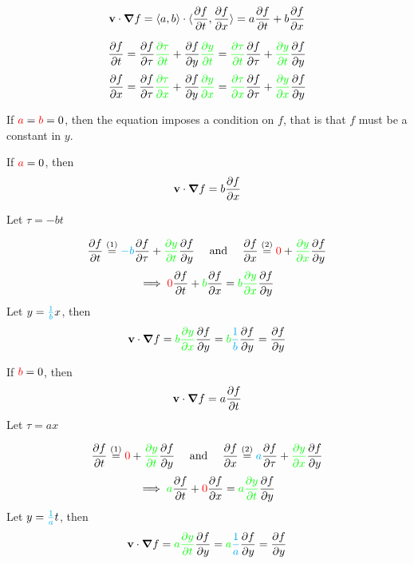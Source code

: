 \documentclass{article}
\begin{document}

\[\vb{v}\cdot \grad{f} = \langle a,b \rangle\cdot \langle
  \pdv{f}{t},\pdv{f}{x} \rangle =a\pdv{f}{t}+b\pdv{f}{x}\]

\begin{equation} \pdv{f}{t} = {\pdv{f}{\tau}} {\color{green} \pdv{\tau}{t}} +{\pdv{f}{y}} {\color{green}\pdv{y}{t}} =
  {\color{green}\pdv{\tau}{t}}\pdv{f}{\tau}
  +{\color{green}\pdv{y}{t}}\pdv{f}{y}
\end{equation}
\begin{equation}
  \pdv{f}{x} = {\pdv{f}{\tau}}{\color{green}\pdv{\tau}{x}}
  +{\pdv{f}{y}}{\color{green} \pdv{y}{x}} =
  {\color{green}\pdv{\tau}{x}}\pdv{f}{\tau}
  +{\color{green}\pdv{y}{x}}\pdv{f}{y}
  \end{equation}

If ${\color{red} a} = {\color{red}b} = 0$, then the equation imposes a
condition on $f$, that is that $f$ must be a constant in $y$.

If ${\color{red}a} = 0$, then
\[\vb{v}\cdot \grad{f} = b\pdv{f}{x}\]

Let $\tau = -bt$

\[\pdv{f}{t}
  \overset{(1)}{=} {\color{cyan} -b}\pdv{f}{\tau}
  +{\color{green}\pdv{y}{t}}\pdv{f}{y}\quad\text{ and }\quad\pdv{f}{x} \overset{(2)}{=} {\color{red} 0} + {\color{green}
    \pdv{y}{x}}\pdv{f}{y}\]
\[\implies {\color{red} 0}\pdv{f}{t} + {\color{green}b}\pdv{f}{x} ={\color{green}
    b\pdv{y}{x}}\pdv{f}{y} \]
Let $y = {\color{cyan}\frac{1}{b}}x$, then
\[\vb{v}\cdot\grad{f} = {\color{green}
    b\pdv{y}{x}}\pdv{f}{y} ={\color{green}
    b}{\color{cyan}\frac{1}{b}}\pdv{f}{y}= \pdv{f}{y}\]

If ${\color{red}b} = 0$, then
\[\vb{v}\cdot \grad{f} = a\pdv{f}{t}\]
Let $\tau = ax$

\[\pdv{f}{t} \overset{(1)}{=} {\color{red} 0}
  +{\color{green}\pdv{y}{t}}\pdv{f}{y}\quad \text{ and }\quad\pdv{f}{x} \overset{(2)}{=}  {\color{cyan} a}\pdv{f}{\tau} + {\color{green}
    \pdv{y}{x}}\pdv{f}{y}\]
\[\implies {\color{green} a}\pdv{f}{t} + {\color{red} 0}\pdv{f}{x} ={\color{green}
    a\pdv{y}{t}}\pdv{f}{y} \]
Let $y = {\color{cyan}\frac{1}{a}}t$, then
\[\vb{v}\cdot\grad{f} = {\color{green}
    a\pdv{y}{t}}\pdv{f}{y} ={\color{green}
    a}{\color{cyan}\frac{1}{a}}\pdv{f}{y}= \pdv{f}{y}\]
\end{document}
